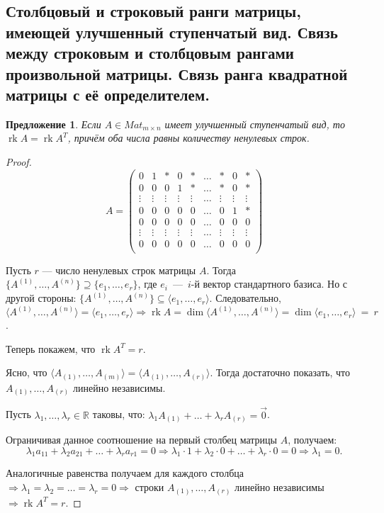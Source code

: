 \documentclass[a4paper, 12pt]{article}
\DeclareMathOperator{\rk}{rk}
\newtheorem*{proposal}{Предложение}
\newcommand{\bbR}[0]{\mathbb{R}}
\begin{document}
\subsection{Столбцовый и строковый ранги матрицы, имеющей улучшенный ступенчатый вид. Связь между строковым и столбцовым рангами произвольной матрицы. Связь ранга квадратной матрицы с её определителем.}
\begin{proposal}
\textit{Если $A \in Mat_{m \times n}$ имеет улучшенный ступенчатый вид, то $\rk A = \rk A^T$, причём оба числа равны количеству ненулевых строк.}
\end{proposal}
\begin{proof}
\[A = \begin{pmatrix}
0 & 1 & * & 0 & * & \ldots & * & 0 & *\\
0 & 0 & 0 & 1 & * & \ldots & * & 0 & *\\
\vdots & \vdots & \vdots & \vdots & \vdots & \ldots & \vdots & \vdots & \vdots\\
0 & 0 & 0 & 0 & 0 & \ldots & 0 & 1 & *\\
0 & 0 & 0 & 0 & 0 & \ldots & 0 & 0 & 0\\
\vdots & \vdots & \vdots & \vdots & \vdots & \ldots & \vdots & \vdots & \vdots\\
0 & 0 & 0 & 0 & 0 & \ldots & 0 & 0 & 0\\
\end{pmatrix}\]

Пусть $r$ --- число ненулевых строк матрицы $A$. Тогда $\{A^{(1)}, \ldots, A^{(n)}\} \supseteq \{e_1, \ldots, e_r\}$, где $e_i$~---~$i$-й вектор стандартного базиса. Но с другой стороны: $\{A^{(1)}, \ldots, A^{(n)}\} \subseteq \langle e_1, \ldots, e_r \rangle$. Следовательно, $\langle A^{(1)}, \ldots, A^{(n)} \rangle = \langle e_1, \ldots , e_r \rangle \Rightarrow \rk A = \dim \langle A^{(1)}, \ldots, A^{(n)} \rangle = \dim \langle e_1, \ldots, e_r \rangle~=~r$.

Теперь покажем, что $\rk A^T = r$.

Ясно, что $\langle A_{(1)}, \ldots, A_{(m)} \rangle = \langle A_{(1)}, \ldots, A_{(r)} \rangle$. Тогда достаточно показать, что $A_{(1)}, \ldots, A_{(r)}$ линейно независимы. 

Пусть $\lambda_1, \ldots, \lambda_r \in \bbR$ таковы, что: $\lambda_1A_{(1)} + \ldots + \lambda_rA_{(r)} = \vec{0}$.

Ограничивая данное соотношение на первый столбец матрицы $A$, получаем:
$$\lambda_1a_{11} + \lambda_2a_{21} + \ldots + \lambda_ra_{r1} = 0 \Rightarrow \lambda_1 \cdot 1 + \lambda_2 \cdot 0 + \ldots + \lambda_r \cdot 0 = 0 \Rightarrow \lambda_1 = 0.$$

Аналогичные равенства получаем для каждого столбца $\Rightarrow \lambda_1 = \lambda_2 = \ldots = \lambda_r = 0 \Rightarrow$ строки $A_{(1)}, \ldots, A_{(r)}$ линейно независимы $\Rightarrow \rk A^T = r$.
\end{proof}
\end{document}
